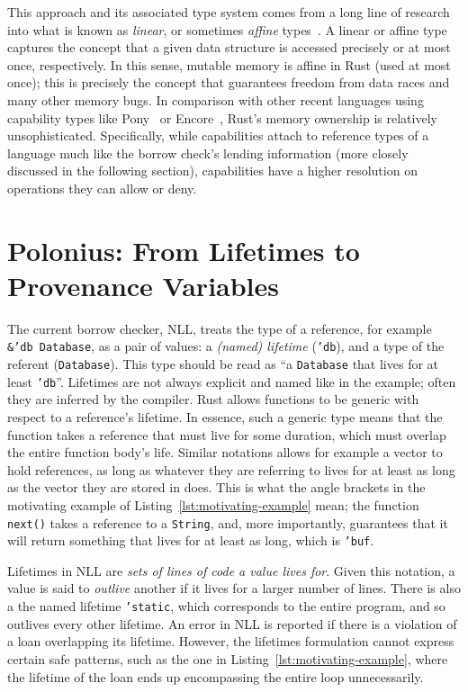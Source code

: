 \documentclass[11pt,a4paper,twoside,openany,draft]{report}
\newcommand{\InRust}[1]{\texttt{#1}}
\begin{document}
This approach and its associated type system comes from a long line of research
into what is known as \textit{linear}, or sometimes \textit{affine}
types~\cite{wadler1990linear}. A linear or affine type captures the concept that
a given data structure is accessed precisely or at most once, respectively. In
this sense, mutable memory is affine in Rust (used at most once); this is
precisely the concept that guarantees freedom from data races and many other
memory bugs. In comparison with other recent languages using capability types
like Pony~\cite{clebsch2015pony, Clebsch:2015:DCS:2824815.2824816} or
Encore~\cite{castegren2018capability}, Rust's memory ownership is relatively
unsophisticated. Specifically, while capabilities attach to reference types of a
language much like the borrow check's lending information (more closely
discussed in the following section), capabilities have a higher resolution on
operations they can allow or deny.

\section{Polonius: From Lifetimes to Provenance
  Variables}\label{sec:reference-provenance}

The current borrow checker, NLL, treats the type of a reference, for example
\InRust{&'db Database}, as a pair of values: a \textit{(named) lifetime}
(\InRust{'db}), and a type of the referent (\InRust{Database}). This type should
be read as ``a \InRust{Database} that lives for at least \InRust{'db}''.
Lifetimes are not always explicit and named like in the example; often they are
inferred by the compiler. Rust allows functions to be generic with respect to a
reference's lifetime. In essence, such a generic type means that the function
takes a reference that must live for some duration, which must overlap the
entire function body's life. Similar notations allows for example a vector to
hold references, as long as whatever they are referring to lives for at least as
long as the vector they are stored in does. This is what the angle brackets in
the motivating example of Listing~\ref{lst:motivating-example} mean; the
function \InRust{next()} takes a reference to a \InRust{String}, and, more
importantly, guarantees that it will return something that lives for at least as
long, which is \InRust{'buf}.

Lifetimes in NLL are \textit{sets of lines of code a value lives for}. Given
this notation, a value is said to \textit{outlive} another if it lives for a
larger number of lines. There is also a the named lifetime \InRust{'static},
which corresponds to the entire program, and so outlives every other lifetime.
An error in NLL is reported if there is a violation of a loan overlapping its
lifetime. However, the lifetimes formulation cannot express certain safe patterns, such as
the one in Listing~\ref{lst:motivating-example}, where the lifetime of the loan
ends up encompassing the entire loop unnecessarily.
\end{document}
